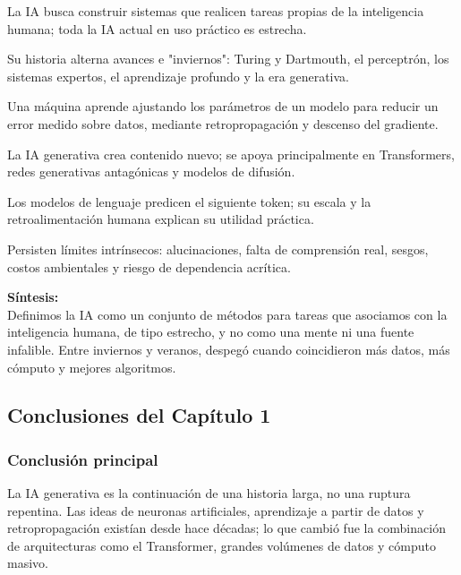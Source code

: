 \begin{resumenlist}
    \item[01] La IA busca construir sistemas que realicen tareas propias de la inteligencia humana; toda la IA actual en uso práctico es estrecha.
    \item[02] Su historia alterna avances e "inviernos": Turing y Dartmouth, el perceptrón, los sistemas expertos, el aprendizaje profundo y la era generativa.
    \item[03] Una máquina aprende ajustando los parámetros de un modelo para reducir un error medido sobre datos, mediante retropropagación y descenso del gradiente.
    \item[04] La IA generativa crea contenido nuevo; se apoya principalmente en Transformers, redes generativas antagónicas y modelos de difusión.
    \item[05] Los modelos de lenguaje predicen el siguiente token; su escala y la retroalimentación humana explican su utilidad práctica.
    \item[06] Persisten límites intrínsecos: alucinaciones, falta de comprensión real, sesgos, costos ambientales y riesgo de dependencia acrítica.
\end{resumenlist}

\begin{cajabeige}
\textbf{Síntesis:}\\
Definimos la IA como un conjunto de métodos para tareas que asociamos con la inteligencia humana, de tipo estrecho, y no como una mente ni una fuente infalible. Entre inviernos y veranos, despegó cuando coincidieron más datos, más cómputo y mejores algoritmos.
\end{cajabeige}

\newpage
{}
\subsection*{Conclusiones del Capítulo 1}

\subsubsection*{Conclusión principal}
La IA generativa es la continuación de una historia larga, no una ruptura repentina. Las ideas de neuronas artificiales, aprendizaje a partir de datos y retropropagación existían desde hace décadas; lo que cambió fue la combinación de arquitecturas como el Transformer, grandes volúmenes de datos y cómputo masivo.

